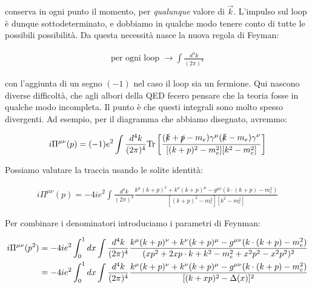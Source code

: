 \documentclass[11pt]{report}
\begin{document}
\begin{center}
\end{center}

conserva in ogni punto il momento, per \emph{qualunque} valore di \(\vec{k}\). L'impulso sul loop è dunque sottodeterminato, e dobbiamo in qualche modo tenere conto di tutte le possibili possibilità. Da questa necessità nasce la nuova regola di Feyman: 

\begin{align}
    \text{per ogni loop } \rightarrow \int \frac{d^4k}{(2\pi)^4}
\end{align}

con l'aggiunta di un segno \((-1)\) nel caso il loop sia un fermione. Qui nascono diverse difficoltà, che agli albori della QED fecero pensare che la teoria fosse in qualche modo incompleta. Il punto è che questi integrali sono molto spesso divergenti. Ad esempio, per il diagramma che abbiamo disegnato, avremmo: 

\begin{align}
    i\Pi^{\mu\nu}(p) = (-1)e^2 \int \frac{d^4k}{(2\pi)^4}\text{Tr}\left[\frac{(\slashed{k}+\slashed{p} - m_e)\gamma^\mu (\slashed{k}-m_e)\gamma^\nu}{[(k+p)^2-m_e^2][k^2-m^2_e]} \right]
\end{align}

Possiamo valutare la traccia usando le solite identità: 

\begin{align}
    i\Pi^{\mu\nu}(p) = -4ie^2 \int \frac{d^4k}{(2\pi)^4}\frac{k^\mu (k+p)^\nu + k^\nu (k+p)^\mu - g^{\mu\nu}(k\cdot (k+p) - m_e^2)}{[(k+p)^2-m_e^2][k^2-m^2_e]}
\end{align}

Per combinare i denominatori introduciamo i parametri di Feynman: 

\begin{align}
    i\Pi^{\mu\nu}(p^2) &= -4ie^2 \int_0^1 dx \int \frac{d^4k}{(2\pi)^4}\frac{k^\mu (k+p)^\nu + k^\nu (k+p)^\mu - g^{\mu\nu}(k\cdot (k+p) - m_e^2)}{(xp^2 + 2xp\cdot k + k^2 - m_e^2 + x^2p^2 - x^2p^2)^2} \notag \\
    &= -4ie^2 \int_0^1 dx \int \frac{d^4k}{(2\pi)^4}\frac{k^\mu (k+p)^\nu + k^\nu (k+p)^\mu - g^{\mu\nu}(k\cdot (k+p) - m_e^2)}{[(k+xp)^2 - \Delta(x)]^2}
\end{align}
\end{document}
